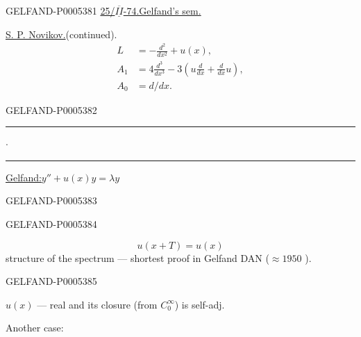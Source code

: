 \begin{GelfandAdjacentEvidence}{GELFAND-P000538}{1}
\uline{25/\mbox{$\overline{\underline{II}}$}-74.}\qquad\uline{Gelfand’s sem.}

\uline{S. P. Novikov.}\qquad (continued).
\[
\begin{aligned}
L&=-\frac{d^2}{dx^2}+u(x),\\
A_1&=4\frac{d^3}{dx^3}-3\left(u\frac d{dx}+\frac d{dx}u\right),\\
A_0&=d/dx.
\end{aligned}
\]
\end{GelfandAdjacentEvidence}
\begin{GelfandAdjacentEvidence}{GELFAND-P000538}{2}


\hfill\rule{1cm}{.35pt}\enspace\(\cdot\)\enspace\rule{1.55cm}{.35pt}\par

\uline{Gelfand:}\quad \(y''+u(x)y=\lambda y\)
\end{GelfandAdjacentEvidence}
\begin{GelfandAdjacentEvidence}{GELFAND-P000538}{3}

\end{GelfandAdjacentEvidence}
\begin{GelfandAdjacentEvidence}{GELFAND-P000538}{4}

\[
u(x+T)=u(x)
\]
structure of the spectrum — shortest proof in Gelfand DAN (\(\approx1950\) ).
\end{GelfandAdjacentEvidence}
\begin{GelfandAdjacentEvidence}{GELFAND-P000538}{5}


$u(x)$ — real and its closure (from \(C_0^\infty\)) is self-adj.

Another case:
\end{GelfandAdjacentEvidence}
